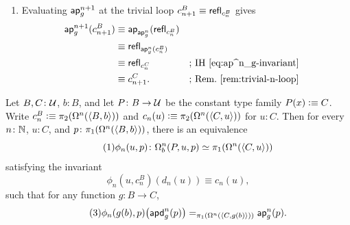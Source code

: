 \begin{defn}
\begin{description}[font=\normalfont\scshape]
\begin{enumerate}[(1)]
            \item Evaluating $\mathsf{ap}^{n+1}_g$ at the trivial loop $c_{n+1}^B\equiv\mathsf{refl}_{c_n^B}$ gives
            \begin{align*}
                \mathsf{ap}^{n+1}_g(c_{n+1}^B)
                    &\equiv \mathsf{ap}_{\mathsf{ap}^n_g}(\mathsf{refl}_{c_n^B})\\
                    &\equiv \mathsf{refl}_{\mathsf{ap}^n_g(c_n^B)}\\
                    &\equiv \mathsf{refl}_{c_n^C}
                    &&\text{; IH~\eqref{eq:ap^n_g-invariant}}\\
                    &\equiv c_{n+1}^C.
                    &&\text{; Rem.~\ref{rem:trivial-n-loop}}
            \end{align*}
        \end{enumerate}
    \end{description}
\end{defn}

\begin{prop}\label{prop:apd-n-constant}
    Let\/ $B,C\colon\univ$,\/ $b\colon B$, and let\/ $P\colon B\to\univ$ be the constant type family\/ $P(x)\mathrel{\vcentcolon}\equiv C$. Write\/ $c_n^B\mathrel{\vcentcolon}\equiv\pi_2(\Omega^n(\langle B,b\rangle))$ and\/ $c_n(u)\mathrel{\vcentcolon}\equiv\pi_2(\Omega^n(\langle C,u\rangle))$ for\/ $u\colon C$. Then for every\/ $n\colon\N$,\/ $u\colon C$, and\/ $p\colon\pi_1(\Omega^n(\dep{B,b}))$, there is an equivalence
    \begin{equation}\label{eq:phi-n-equiv}\tag{1}
        \phi_n(u,p)\colon \Omega^n_b(P,u,p) \simeq \pi_1(\Omega^n(\dep{C,u}))
    \end{equation}
    satisfying the invariant
    \begin{equation}\label{eq:phi-n-base}\tag{2}
        \phi_n(u,c_n^B)(d_n(u)) \equiv c_n(u),
    \end{equation}
    such that for any function\/ $g\colon B\to C$,
    \begin{equation}\label{eq:phi-n-apd}\tag{3}
        \phi_n(g(b),p)\bigl(\mathsf{apd}^n_g(p)\bigr) \mathrel{=_{\pi_1(\Omega^n(\langle C,g(b)\rangle))}} \mathsf{ap}^n_g(p).
    \end{equation}
\end{prop}

